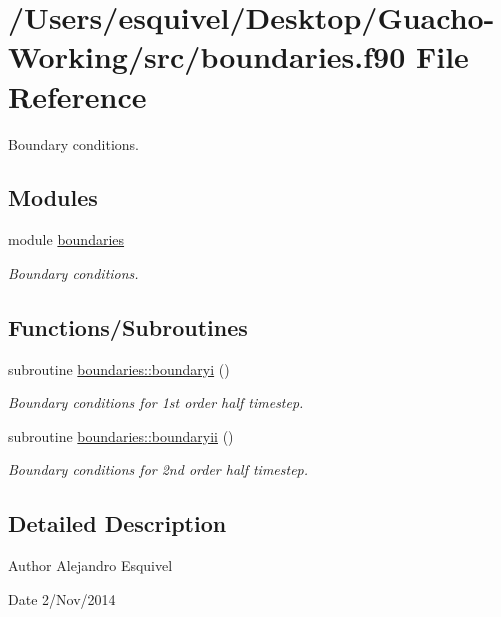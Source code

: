 \hypertarget{boundaries_8f90}{}\section{/\+Users/esquivel/\+Desktop/\+Guacho-\/\+Working/src/boundaries.f90 File Reference}
\label{boundaries_8f90}


Boundary conditions.  


\subsection*{Modules}
\begin{DoxyCompactItemize}
\item 
module \hyperlink{namespaceboundaries}{boundaries}
\begin{DoxyCompactList}\small\item\em Boundary conditions. \end{DoxyCompactList}\end{DoxyCompactItemize}
\subsection*{Functions/\+Subroutines}
\begin{DoxyCompactItemize}
\item 
subroutine \hyperlink{namespaceboundaries_a6292ba1e627b19087dc005cdc415213d}{boundaries\+::boundaryi} ()
\begin{DoxyCompactList}\small\item\em Boundary conditions for 1st order half timestep. \end{DoxyCompactList}\item 
subroutine \hyperlink{namespaceboundaries_acca5de134bd57d541d58574471fd8419}{boundaries\+::boundaryii} ()
\begin{DoxyCompactList}\small\item\em Boundary conditions for 2nd order half timestep. \end{DoxyCompactList}\end{DoxyCompactItemize}


\subsection{Detailed Description}
\begin{DoxyAuthor}{Author}
Alejandro Esquivel 
\end{DoxyAuthor}
\begin{DoxyDate}{Date}
2/\+Nov/2014 
\end{DoxyDate}
